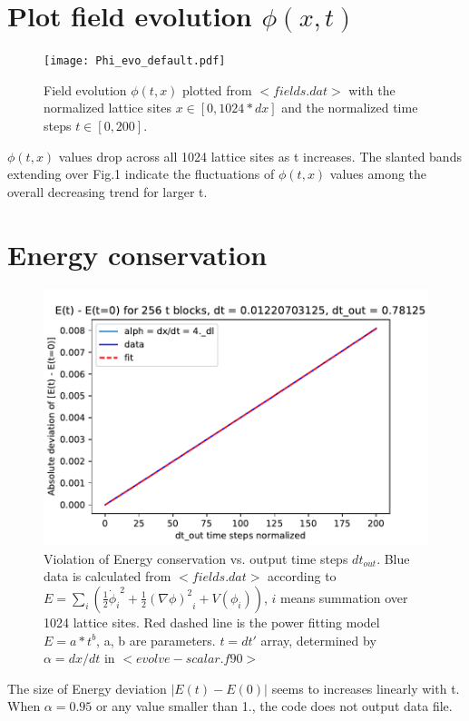\documentclass{article}
\begin{document}
\section{Plot field evolution $\phi(x, t)$}
\begin{figure}[H]
    \centering
    \texttt{[image: Phi\_evo\_default.pdf]}
    \caption{Field evolution $\phi(t, x)$ plotted from $<fields.dat>$ with the normalized lattice sites $x\in{[0, 1024*dx]}$ and the normalized time steps $t\in{[0, 200]}$.}
    \label{fig:Q3}
\end{figure}

$\phi(t, x)$ values drop across all 1024 lattice sites as t increases. The slanted bands extending over Fig.1 indicate the fluctuations of $\phi(t, x)$ values among the overall decreasing trend for larger t.

\section{Energy conservation}

\begin{figure}[H]
    \centering
    \includegraphics[scale=0.7]{E_dev_alph=4}
    \caption{Violation of Energy conservation vs. output time steps $dt_{out}$. Blue data is calculated from $<fields.dat>$ according to $E=\sum_i(\frac{1}{2}{\dot\phi_i}^2+\frac{1}{2}{(\nabla{\phi})^2}_i+V(\phi_i))$, $i$ means summation over 1024 lattice sites. Red dashed line is the power fitting model $E = a*{t}^b$, a, b are parameters. $t=dt'$ array, determined by $\alpha=dx/dt$ in $<evolve-scalar.f90>$}
    \label{fig:Q4}
\end{figure}

The size of Energy deviation $|E(t) - E(0)|$ seems to increases linearly with t. When $\alpha = 0.95$ or any value smaller than 1., the code does not output data file. 
\end{document}
